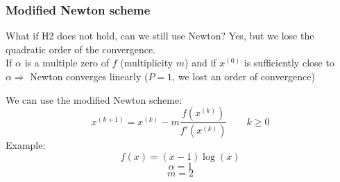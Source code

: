 \subsubsection{Modified Newton scheme}
What if H2 does not hold, can we still use Newton? Yes, but we lose the quadratic order of the convergence.\\
If $\alpha$ is a multiple zero of $f$ (multiplicity $m$) and if $x^{(0)}$ is sufficiently close to $\alpha\Rightarrow$ Newton converges linearly ($P=1$, we lost an order of convergence)

We can use the modified Newton scheme:
$$x^{(k+1)}=x^{(k)}-m\frac{f(x^{(k)})}{f'(x^{(k)})}\qquad k\geq 0$$
Example:
$$f(x)=(x-1)\log(x)$$
$$\alpha=1$$
$$m=2$$
\begin{figure}[!ht]
    \begin{minipage}{\linewidth}
        \centering
    \end{minipage}
\end{figure}

